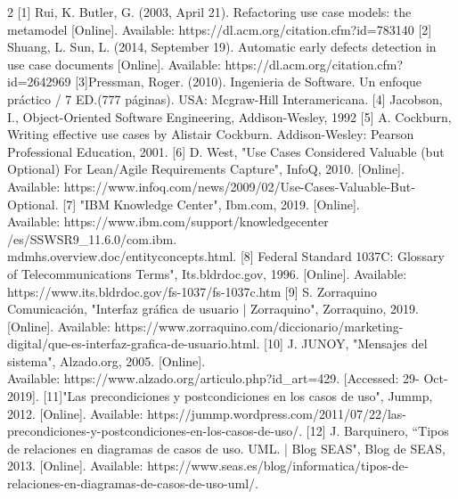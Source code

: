 \documentclass{article}
\begin{document}
\begin{multicols}{2}
	[1] Rui, K. Butler, G. (2003, April 21). Refactoring use case models: the metamodel [Online]. Available: https://dl.acm.org/citation.cfm?id=783140
	[2] Shuang, L. Sun, L. (2014, September 19). Automatic early defects detection in use case documents [Online]. Available: https://dl.acm.org/citation.cfm?id=2642969
	[3]Pressman, Roger. (2010). Ingenieria de Software. Un enfoque práctico / 7 ED.(777 páginas). USA: Mcgraw-Hill Interamericana.
	[4] Jacobson, I., Object-Oriented Software Engineering, Addison-Wesley, 1992
	[5] A. Cockburn, Writing effective use cases by Alistair Cockburn. Addison-Wesley: Pearson Professional Education, 2001. 
	[6] D. West, "Use Cases Considered Valuable (but Optional) For Lean/Agile Requirements Capture", InfoQ, 2010. [Online]. Available: https://www.infoq.com/news/2009/02/Use-Cases-Valuable-But-Optional. 
	[7] "IBM Knowledge Center", Ibm.com, 2019. [Online].\\ Available: https://www.ibm.com/support/knowledgecenter\\/es/SSWSR9\_11.6.0/com.ibm.\\mdmhs.overview.doc/entityconcepts.html.
	[8] Federal Standard 1037C: Glossary of Telecommunications Terms", Its.bldrdoc.gov, 1996. [Online]. Available: https://www.its.bldrdoc.gov/fs-1037/fs-1037c.htm
	[9] S. Zorraquino Comunicación, "Interfaz gráfica de usuario | Zorraquino", Zorraquino, 2019. [Online]. Available: https://www.zorraquino.com/diccionario/marketing-digital/que-es-interfaz-grafica-de-usuario.html.
	[10] J. JUNOY, "Mensajes del sistema", Alzado.org, 2005. [Online]. \\ Available: https://www.alzado.org/articulo.php?id\_art=429. [Accessed: 29- Oct- 2019].
	[11]"Las precondiciones y postcondiciones en los casos de uso", Jummp, 2012. [Online]. Available: https://jummp.wordpress.com/2011/07/22/las-precondiciones-y-postcondiciones-en-los-casos-de-uso/.
	[12] J. Barquinero, “Tipos de relaciones en diagramas de casos de uso. UML. | Blog SEAS", Blog de SEAS, 2013. [Online]. Available: https://www.seas.es/blog/informatica/tipos-de-relaciones-en-diagramas-de-casos-de-uso-uml/. 
	\end{multicols}
\end{document}
